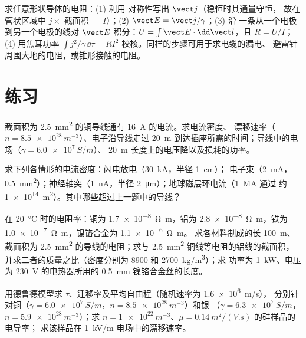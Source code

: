 \begin{method}[由局部定律到积分定律]\label{met:b2:charges-currents-conduction:method}
求任意形状导体的电阻：(1) 利用
对称性写出 $\vect j$（稳恒时其通量守恒，
故在管状区域中 $j \times$ 截面积 $= I$）；(2) $\vect E = \vect j/\gamma$；(3) 沿
一条从一个电极到另一个电极的线对 $\vect E$ 积分：$U = \int\vect E\cdot
\dd\vect l$，且 $R = U/I$；(4) 用焦耳功率 $\int j^2/\gamma\,
\dd\tau = RI^2$ 校核。同样的步骤可用于求电缆的漏电、
避雷针周围大地的电阻，或锥形接触的电阻。
\end{method}

\section{练习}

\begin{exercise}[$\star$]\label{exo:b2:charges-currents-conduction:1}
截面积为 \qty{2.5}{mm^2} 的铜导线通有 \qty{16}{A} 的电流。求电流密度、
漂移速率（$n = \qty{8.5e28}{m^{-3}}$）、电子沿导线走过
\qty{20}{m} 到达插座所需的时间；导线中的电场（$\gamma = \qty{6.0e7}{S/m}$）、
\qty{20}{m} 长度上的电压降以及损耗的功率。
\end{exercise}

\begin{exercise}[$\star$]\label{exo:b2:charges-currents-conduction:2}
求下列各情形的电流密度：闪电放电（\qty{30}{kA}，半径 \qty{1}{cm}）；
电子束（\qty{2}{mA}，\qty{0.5}{mm^2}）；神经轴突（\qty{1}{nA}，半径
\qty{2}{\micro m}）；地球磁层环电流（\qty{1}{MA} 通过
约 \qty{1e14}{m^2}）。其中哪些超过上一题中的导线？
\end{exercise}

\begin{exercise}[$\star$]\label{exo:b2:charges-currents-conduction:3}
在 \qty{20}{\degreeCelsius} 时的电阻率：铜为 \qty{1.7e-8}{\ohm.m}，铝为
\qty{2.8e-8}{\ohm.m}，铁为 \qty{1.0e-7}{\ohm.m}，镍铬合金为 \qty{1.1e-6}{\ohm.m}。
求各材料制成的长 \qty{100}{m}、截面积为 \qty{2.5}{mm^2} 的导线的电阻；求与
\qty{2.5}{mm^2} 铜线等电阻的铝线的截面积，并求二者的质量之比（密度分别为
$8900$ 和 \qty{2700}{kg/m^3}）；求
功率为 \qty{1}{kW}、电压为 \qty{230}{V} 的电热器所用的 \qty{0.5}{mm} 镍铬合金丝的长度。
\end{exercise}

\begin{exercise}[$\star$]\label{exo:b2:charges-currents-conduction:4}
用德鲁德模型求 $\tau$、迁移率及平均自由程（随机速率为 \qty{1.6e6}{m/s}），
分别针对铜（$\gamma = \qty{6.0e7}{S/m}$，$n = \qty{8.5e28}{m^{-3}}$）和银
（$\gamma = \qty{6.3e7}{S/m}$，$n = \qty{5.9e28}{m^{-3}}$）；求
$n = \qty{1e22}{m^{-3}}$、$\mu = \qty{0.14}{m^2/(V.s)}$ 的硅样品的电导率；
求该样品在 \qty{1}{kV/m} 电场中的漂移速率。
\end{exercise}

